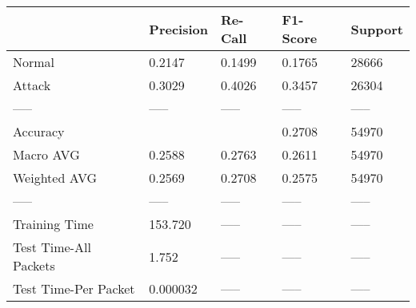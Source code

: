 \begin{tabular}{lllll}
\toprule
{} & Precision & Re-Call & F1-Score & Support \\
\midrule
Normal                &    0.2147 &  0.1499 &   0.1765 &   28666 \\
Attack                &    0.3029 &  0.4026 &   0.3457 &   26304 \\
-----                 &     ----- &   ----- &    ----- &   ----- \\
Accuracy              &           &         &   0.2708 &   54970 \\
Macro AVG             &    0.2588 &  0.2763 &   0.2611 &   54970 \\
Weighted AVG          &    0.2569 &  0.2708 &   0.2575 &   54970 \\
-----                 &     ----- &   ----- &    ----- &   ----- \\
Training Time         &   153.720 &   ----- &    ----- &   ----- \\
Test Time-All Packets &     1.752 &   ----- &    ----- &   ----- \\
Test Time-Per Packet  &  0.000032 &   ----- &    ----- &   ----- \\
\bottomrule
\end{tabular}
